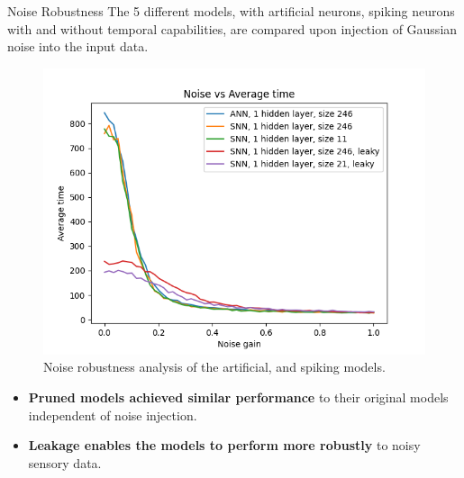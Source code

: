 \documentclass[final,35pt]{beamer}
\newlength{\colwidth}
\begin{document}
\begin{frame}
\begin{columns}[t]
\begin{column}{\colwidth}
  \begin{block}{{\fontsize{48}{40}\selectfont Noise Robustness}}
  {
The 5 different models, with artificial neurons, spiking neurons with and without temporal capabilities, are compared upon injection of Gaussian noise into the input data. 
}
\begin{figure}
    \centering
    \includegraphics[width=.85\textwidth]{figures/Noise_Robustness_5Models.png}
    \caption{{\fontsize{28}{40}\selectfont Noise robustness analysis of the artificial, and spiking models.}}
    \label{fig:enter-label}
\end{figure}
{
\begin{itemize}
    \item \textbf{Pruned models achieved similar performance} to their original models independent of noise injection.
    \item \textbf{Leakage enables the models to perform more robustly} to noisy sensory data.
\end{itemize}

}
  \end{block}

\vspace{-0.75cm}


\end{column}
\end{columns}
\end{frame}
\end{document}
